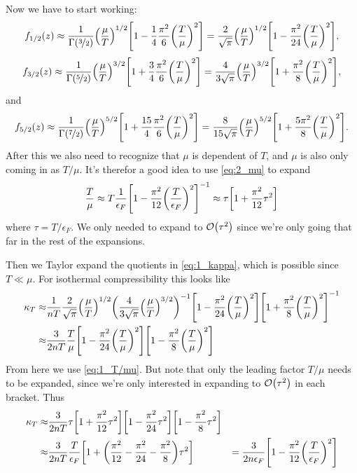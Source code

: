 \documentclass[11pt,letter, swedish, english
]{article}
\begin{document}
Now we have to start working:
\begin{equation}\label{eq:1_1/2}
f_{1/2}(z)\approx\frac{1}{\Gamma(\nicefrac{3}{2})}\qty(\frac{\mu}{T})^{1/2}
\qty[
1-\frac{1}{4}\frac{\pi^2}{6}\qty(\frac{T}{\mu})^2]
=\frac{2}{\sqrt{\pi}}\qty(\frac{\mu}{T})^{1/2}
\qty[
1-\frac{\pi^2}{24}\qty(\frac{T}{\mu})^2],
\end{equation}
\begin{equation}\label{eq:1_3/2}
f_{3/2}(z)\approx\frac{1}{\Gamma(\nicefrac{5}{2})}\qty(\frac{\mu}{T})^{3/2}
\qty[
1+\frac{3}{4}\frac{\pi^2}{6}\qty(\frac{T}{\mu})^2]
=\frac{4}{3\sqrt{\pi}}\qty(\frac{\mu}{T})^{3/2}
\qty[1+\frac{\pi^2}{8}\qty(\frac{T}{\mu})^2],
\end{equation}
and 
\begin{equation}\label{eq:1_5/2}
f_{5/2}(z)\approx\frac{1}{\Gamma(\nicefrac{7}{2})}\qty(\frac{\mu}{T})^{5/2}
\qty[
1+\frac{15}{4}\frac{\pi^2}{6}\qty(\frac{T}{\mu})^2]
=\frac{8}{15\sqrt{\pi}}\qty(\frac{\mu}{T})^{5/2}
\qty[1+\frac{5\pi^2}{8}\qty(\frac{T}{\mu})^2].
\end{equation}
After this we also need to recognize that $\mu$ is dependent of
$T$, and $\mu$ is also only coming in as $T/\mu$. It's therefor a
good idea to use \eqref{eq:2_mu} to expand
\begin{equation}\label{eq:1_T/mu}
\frac{T}{\mu}\approx T \frac{1}{\epsilon_F}\qty[ 1
-\frac{\pi^2}{12}\qty(\frac{T}{\epsilon_F})^2]^{-1}
\approx\tau\qty[1
+\frac{\pi^2}{12}\tau^2]
\end{equation}
where $\tau=T/\epsilon_F$. We only needed to expand to
$\order{\tau^2}$ since we're only going that far in the rest of the
expansions. 

Then we Taylor expand the quotients in \eqref{eq:1_kappa},
which is possible since $T\ll\mu$. 
For isothermal compressibility this looks like
\begin{equation}
\begin{aligned}
\kappa_T\approx& \frac{1}{nT} 
\frac{2}{\sqrt{\pi}}\qty(\frac{\mu}{T})^{1/2}
\qty(\frac{4}{3\sqrt{\pi}}\qty(\frac{\mu}{T})^{3/2})^{-1}
\qty[
1-\frac{\pi^2}{24}\qty(\frac{T}{\mu})^2]
\qty[
1+\frac{\pi^2}{8}\qty(\frac{T}{\mu})^2]^{-1}\\
\approx&
 \frac{3}{2nT}\frac{T}{\mu}
\qty[
1-\frac{\pi^2}{24}\qty(\frac{T}{\mu})^2]
\qty[
1-\frac{\pi^2}{8}\qty(\frac{T}{\mu})^2]\\
\end{aligned}
\end{equation}
From here we use \eqref{eq:1_T/mu}. But note that only the leading
factor $T/\mu$ needs to be expanded, since we're only interested in
expanding to $\order{\tau^2}$ in each bracket. Thus
\begin{equation}
\begin{aligned}
\kappa_T\approx& \frac{3}{2nT}
\tau\qty[1 +\frac{\pi^2}{12}\tau^2]
\qty[1 -\frac{\pi^2}{24}\tau^2]
\qty[1 -\frac{\pi^2}{8}\tau^2]\\
\approx& \frac{3}{2nT}
\frac{T}{\epsilon_F}\qty[1 +
\qty(\frac{\pi^2}{12}-\frac{\pi^2}{24}-\frac{\pi^2}{8})
\tau^2] 
&=\frac{3}{2n\epsilon_F}
\qty[1 - \frac{\pi^2}{12}\qty(\frac{T}{\epsilon_F})^2]
\end{aligned}
\end{equation}
\end{document}
